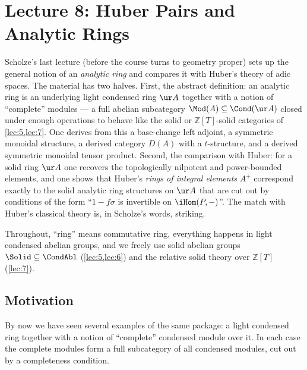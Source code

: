 \section{Lecture 8: Huber Pairs and Analytic Rings}
\label{lec:8}

Scholze's last lecture (before the course turns to geometry proper) sets up the
general notion of an \emph{analytic ring} and compares it with Huber's theory of
adic spaces. The material has two halves. First, the abstract definition: an
analytic ring is an underlying light condensed ring $\ur A$ together with a
notion of ``complete'' modules --- a full abelian subcategory
$\Mod(A)\subseteq\Cond(\ur A)$ closed under enough operations to behave like the
solid or $\mathbb{Z}[T]$-solid categories of \cref{lec:5,lec:7}. One derives from
this a base-change left adjoint, a symmetric monoidal structure, a derived
category $D(A)$ with a $t$-structure, and a derived symmetric monoidal tensor
product. Second, the comparison with Huber: for a solid ring $\ur A$ one recovers
the topologically nilpotent and power-bounded elements, and one shows that
Huber's \emph{rings of integral elements} $A^{+}$ correspond exactly to the solid
analytic ring structures on $\ur A$ that are cut out by conditions of the form
``$1-f\sigma$ is invertible on $\iHom(P,-)$''. The match with Huber's classical
theory is, in Scholze's words, striking.

Throughout, ``ring'' means commutative ring, everything happens in light
condensed abelian groups, and we freely use solid abelian groups
$\Solid\subseteq\CondAbl$ (\cref{lec:5,lec:6}) and the relative solid theory over
$\mathbb{Z}[T]$ (\cref{lec:7}).

\subsection{Motivation}

By now we have seen several examples of the same package: a light condensed ring
together with a notion of ``complete'' condensed module over it. In each case the
complete modules form a full subcategory of all condensed modules, cut out by a
completeness condition.

